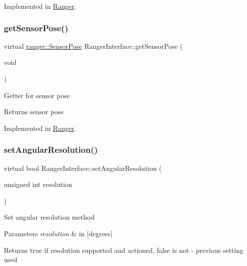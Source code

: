 Implemented in \hyperlink{classRanger_a47e30b7ec55adec5bb542278ccfee140}{Ranger}.

\mbox{\label{classRangerInterface_a7f6db3f603d997ad6c5aa5c7778261f4}} 
\subsubsection{\texorpdfstring{get\+Sensor\+Pose()}{getSensorPose()}}
{\footnotesize\ttfamily virtual \hyperlink{structranger_1_1SensorPose}{ranger\+::\+Sensor\+Pose} Ranger\+Interface\+::get\+Sensor\+Pose (\begin{DoxyParamCaption}\item[{void}]{ }\end{DoxyParamCaption})\hspace{0.3cm}{\ttfamily [pure virtual]}}

Getter for sensor pose \begin{DoxyReturn}{Returns}
sensor pose 
\end{DoxyReturn}


Implemented in \hyperlink{classRanger_aec1e730fbf4b46b01b08f6655152fc39}{Ranger}.

\mbox{\label{classRangerInterface_aecffc9bbb58379da741c18326b9e41db}} 
\subsubsection{\texorpdfstring{set\+Angular\+Resolution()}{setAngularResolution()}}
{\footnotesize\ttfamily virtual bool Ranger\+Interface\+::set\+Angular\+Resolution (\begin{DoxyParamCaption}\item[{unsigned int}]{resolution }\end{DoxyParamCaption})\hspace{0.3cm}{\ttfamily [pure virtual]}}

Set angular resolution method 
\begin{DoxyParams}{Parameters}
{\em resolution} & in \mbox{[}degrees\mbox{]} \\
\hline
\end{DoxyParams}
\begin{DoxyReturn}{Returns}
true if resolution supported and actioned, false is not -\/ previous setting used 
\end{DoxyReturn}


